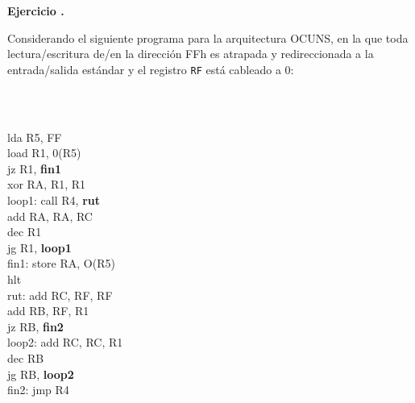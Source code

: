 \documentclass[12pt,a4paper]{article}
\newcounter{ctej}
\newcommand{\ejercicio}{\vspace{1em}\noindent\textbf{Ejercicio \arabic{ctej}.} \addtocounter{ctej}{1}}
\begin{document}
\ejercicio Considerando el siguiente programa para la arquitectura OCUNS, en la que toda lectura/escritura de/en la dirección FFh es atrapada y re{}direccionada a la entrada/salida estándar y el registro \texttt{RF} está cableado a 0: \\[-8mm]
\begin{center}
\begin{minipage}{.1\textwidth}\begin{footnotesize}
\tt
\begin{tabbing}
\qquad\qquad\= \\
        \> lda   R5, FF     \\ %
        \> load  R1, 0(R5)  \\ %
        \> jz    R1, \textbf{fin1}    \\ %
        \> xor   RA, R1, R1 \\ %
loop1:    \> call  R4, \textbf{rut}    \\ %
        \> add   RA, RA, RC \\ %
        \> dec   R1         \\ %
        \> jg    R1, \textbf{loop1}    \\ %
fin1:    \> store RA, O(R5)  \\ %
        \> hlt              \\ %
rut:    \> add   RC, RF, RF \\ %
        \> add   RB, RF, R1 \\ %
        \> jz    RB, \textbf{fin2}    \\ %
loop2:    \> add   RC, RC, R1 \\ %
        \> dec   RB         \\ %
        \> jg    RB, \textbf{loop2}    \\ %
fin2:    \> jmp   R4         \\ %


\end{tabbing}
\end{footnotesize}
\end{minipage}
\end{center}
\end{document}

